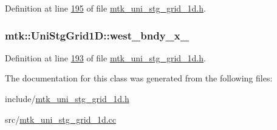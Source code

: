 Definition at line \hyperlink{mtk__uni__stg__grid__1d_8h_source_l00195}{195} of file \hyperlink{mtk__uni__stg__grid__1d_8h_source}{mtk\-\_\-uni\-\_\-stg\-\_\-grid\-\_\-1d.\-h}.

\hypertarget{classmtk_1_1UniStgGrid1D_a6910438d3396d0b9a130d11d16979c46}{
\subsubsection[{west\-\_\-bndy\-\_\-x\-\_\-}]{ mtk\-::\-Uni\-Stg\-Grid1\-D\-::west\-\_\-bndy\-\_\-x\-\_\-\hspace{0.3cm}{\ttfamily [private]}}}\label{classmtk_1_1UniStgGrid1D_a6910438d3396d0b9a130d11d16979c46}


Definition at line \hyperlink{mtk__uni__stg__grid__1d_8h_source_l00193}{193} of file \hyperlink{mtk__uni__stg__grid__1d_8h_source}{mtk\-\_\-uni\-\_\-stg\-\_\-grid\-\_\-1d.\-h}.



The documentation for this class was generated from the following files\-:\begin{DoxyCompactItemize}
\item 
include/\hyperlink{mtk__uni__stg__grid__1d_8h}{mtk\-\_\-uni\-\_\-stg\-\_\-grid\-\_\-1d.\-h}\item 
src/\hyperlink{mtk__uni__stg__grid__1d_8cc}{mtk\-\_\-uni\-\_\-stg\-\_\-grid\-\_\-1d.\-cc}\end{DoxyCompactItemize}
